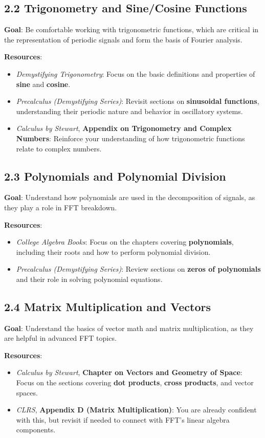 \documentclass{article}
\begin{document}
\subsection*{2.2 Trigonometry and Sine/Cosine Functions}
\textbf{Goal}: Be comfortable working with trigonometric functions, which are critical in the representation of periodic signals and form the basis of Fourier analysis.

\textbf{Resources}:
\begin{itemize}
    \item \textit{Demystifying Trigonometry}: Focus on the basic definitions and properties of \textbf{sine} and \textbf{cosine}.
    \item \textit{Precalculus (Demystifying Series)}: Revisit sections on \textbf{sinusoidal functions}, understanding their periodic nature and behavior in oscillatory systems.
    \item \textit{Calculus by Stewart}, \textbf{Appendix on Trigonometry and Complex Numbers}: Reinforce your understanding of how trigonometric functions relate to complex numbers.
\end{itemize}

\subsection*{2.3 Polynomials and Polynomial Division}
\textbf{Goal}: Understand how polynomials are used in the decomposition of signals, as they play a role in FFT breakdown.

\textbf{Resources}:
\begin{itemize}
    \item \textit{College Algebra Books}: Focus on the chapters covering \textbf{polynomials}, including their roots and how to perform polynomial division.
    \item \textit{Precalculus (Demystifying Series)}: Review sections on \textbf{zeros of polynomials} and their role in solving polynomial equations.
\end{itemize}

\subsection*{2.4 Matrix Multiplication and Vectors}
\textbf{Goal}: Understand the basics of vector math and matrix multiplication, as they are helpful in advanced FFT topics.

\textbf{Resources}:
\begin{itemize}
    \item \textit{Calculus by Stewart}, \textbf{Chapter on Vectors and Geometry of Space}: Focus on the sections covering \textbf{dot products}, \textbf{cross products}, and vector spaces.
    \item \textit{CLRS}, \textbf{Appendix D (Matrix Multiplication)}: You are already confident with this, but revisit if needed to connect with FFT's linear algebra components.
\end{itemize}
\end{document}
